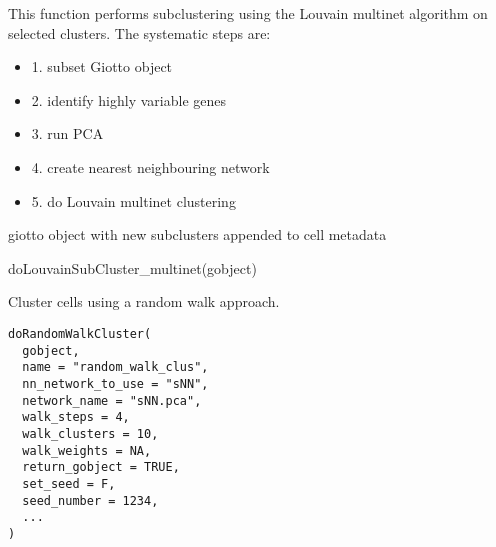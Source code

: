 \documentclass[a4paper]{book}
\begin{document}
%
\begin{Details}\relax
This function performs subclustering using the Louvain multinet algorithm on selected clusters.
The systematic steps are:
\begin{itemize}

\item{} 1. subset Giotto object
\item{} 2. identify highly variable genes
\item{} 3. run PCA
\item{} 4. create nearest neighbouring network
\item{} 5. do Louvain multinet clustering

\end{itemize}

\end{Details}
%
\begin{Value}
giotto object with new subclusters appended to cell metadata
\end{Value}
%
\begin{SeeAlso}\relax
{}
\end{SeeAlso}
%
\begin{Examples}
\begin{ExampleCode}
    doLouvainSubCluster_multinet(gobject)
\end{ExampleCode}
\end{Examples}
%
\begin{Description}\relax
Cluster cells using a random walk approach.
\end{Description}
%
\begin{Usage}
\begin{verbatim}
doRandomWalkCluster(
  gobject,
  name = "random_walk_clus",
  nn_network_to_use = "sNN",
  network_name = "sNN.pca",
  walk_steps = 4,
  walk_clusters = 10,
  walk_weights = NA,
  return_gobject = TRUE,
  set_seed = F,
  seed_number = 1234,
  ...
)
\end{verbatim}
\end{Usage}
%
\end{document}
